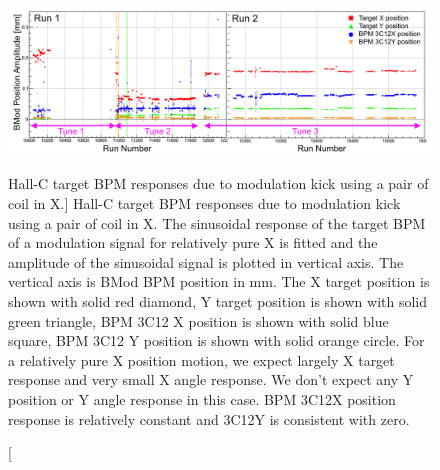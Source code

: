 \begin{singlespace}
\begin{figure}[!h]
	\begin{center}
	\includegraphics[width=15.0cm]{figures/BMod_XMod_Xresponse}
	\end{center}
	\caption
	[Hall-C target BPM responses due to modulation kick using a pair of coil in X.]	
	{
Hall-C target BPM responses due to modulation kick using a pair of coil in X. The sinusoidal response of the target BPM of a modulation signal for relatively pure X is fitted and the amplitude of the sinusoidal signal is plotted in vertical axis. The vertical axis is BMod BPM position in mm. The X target position is shown with solid red diamond, Y target position is shown with solid green triangle, BPM 3C12 X position is shown with solid blue square, BPM 3C12 Y position is shown with solid orange circle. For a relatively pure X position motion, we expect largely X target response and very small X angle response. We don't expect any Y position or Y angle response in this case. BPM 3C12X position response is relatively constant and 3C12Y is consistent with zero.		
	 }
	\label{fig:BMod_XMod_Xresponse}
\end{figure}
\end{singlespace}



